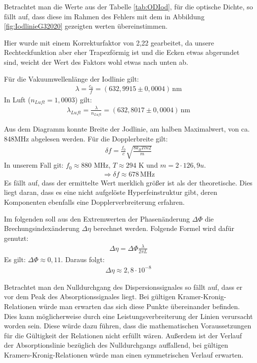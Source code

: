 Betrachtet man die Werte aus der Tabelle \ref{tab:ODIod}, für die optische Dichte, so fällt auf, dass diese im Rahmen des Fehlers mit dem in Abbildung \ref{fig:IodlinieG32020} gezeigten werten übereinstimmen. 

Hier wurde mit einem Korrekturfaktor von 2,22 gearbeitet, da unsere Rechteckfunktion aber eher Trapezförmig ist und die Ecken etwas abgerundet sind, weicht der Wert des Faktors wohl etwas nach unten ab.

Für die Vakuumwellenlänge der Iodlinie gilt:
\begin{gather}
    \lambda = \frac{c_0}{f} = (632,9915 \pm 0,0004) \, \text{nm}
\end{gather}
In Luft ($n_{Luft} = 1,0003$) gilt:
\begin{gather}
    \lambda_{Luft} = \frac{\lambda}{n_{Luft}} = (632,8017 \pm 0,0004)\, \text{nm}
\end{gather}

Aus dem Diagramm konnte Breite der Jodlinie, am halben Maximalwert, von ca. 848MHz abgelesen werden.
Für die Dopplerbreite gilt:
\begin{gather}
    \delta f = \frac{f_0}{c} \sqrt{\frac{8 k_B T ln2}{m}}
\end{gather}
In unserem Fall git: $f_0 \approx 880$ MHz,  $T \approx 294$ K und $m = 2 \cdot 126,9 u$.
\begin{gather}
    \Rightarrow \delta f \approx 678 \, \text{MHz}
\end{gather}
Es fällt auf, dass der ermittelte Wert merklich größer ist als der theoretische. Dies liegt daran, dass es eine nicht aufgelöste Hyperfeinstruktur gibt, deren Komponenten ebenfalls eine Dopplerverbreiterung erfahren.


Im folgenden soll aus den Extremwerten der Phasenänderung $\Delta \Phi$ die Brechungsindexänderung $\Delta \eta$ berechnet werden. Folgende Formel wird dafür genutzt:
\begin{gather}
    \Delta \eta = \Delta \Phi \frac{\lambda}{2 \pi L}
\end{gather}
Es gilt: $\Delta \Phi \approx 0,11$. Daraus folgt:
\begin{gather}
    \Delta \eta \approx 2,8 \cdot 10^{-8}
\end{gather}

Betrachtet man den Nulldurchgang des Dispersionssignales so fällt auf, dass er vor dem Peak des Absorptionssignales liegt. Bei gültigen Kramer-Kronig-Relationen würde man erwarten das sich diese Punkte übereinander befinden. Dies kann möglicherweise durch eine Leistungsverbreiterung der Linien verursacht worden sein. Diese würde dazu führen, dass die mathematischen Voraussetzungen für die Gültigkeit der Relationen nicht erfüllt wären.
Außerdem ist der Verlauf der Absorptionslinie bezüglich des Nulldurchgangs auffallend, bei gültigen Kramers-Kronig-Relationen würde man einen symmetrischen Verlauf erwarten.

